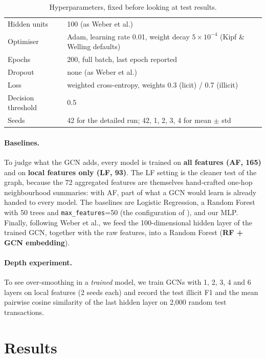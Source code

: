 \documentclass[11pt,a4paper]{article}
\begin{document}
\begin{table}[H]
\centering\small
\begin{tabular}{ll}
\toprule
Hidden units & 100 (as Weber et al.) \\
Optimiser & Adam, learning rate 0.01, weight decay $5\times10^{-4}$ (Kipf \& Welling defaults) \\
Epochs & 200, full batch, last epoch reported \\
Dropout & none (as Weber et al.) \\
Loss & weighted cross-entropy, weights 0.3 (licit) / 0.7 (illicit) \\
Decision threshold & 0.5 \\
Seeds & 42 for the detailed run; 42, 1, 2, 3, 4 for mean $\pm$ std \\
\bottomrule
\end{tabular}
\caption{Hyperparameters, fixed before looking at test results.}
\label{tab:hp}
\end{table}

\paragraph{Baselines.} To judge what the GCN adds, every model is trained on \textbf{all features (AF, 165)} and on \textbf{local
features only (LF, 93)}. The LF setting is the cleaner test of the graph, because the 72 aggregated features are themselves
hand-crafted one-hop neighbourhood summaries: with AF, part of what a GCN would learn is already handed to every model.
The baselines are Logistic Regression, a Random Forest with 50 trees and \texttt{max\_features}=50 (the configuration of
\cite{weber}), and our MLP. Finally, following Weber et al., we feed the 100-dimensional hidden layer of the trained GCN, together with
the raw features, into a Random Forest (\textbf{RF + GCN embedding}).

\paragraph{Depth experiment.} To see over-smoothing in a \emph{trained} model, we train GCNs with 1, 2, 3, 4 and 6 layers on local
features (2 seeds each) and record the test illicit F1 and the mean pairwise cosine similarity of the last hidden layer on 2,000
random test transactions.

\section{Results}
\end{document}
